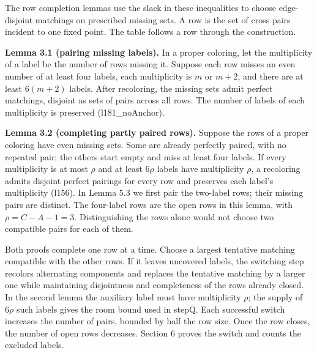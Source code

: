 \documentclass[english,11pt,a4paper]{article}
\begin{document}
The row completion lemmas use the slack in these inequalities to choose edge-disjoint matchings on prescribed missing sets. A row is the set of cross pairs incident to one fixed point. The table follows a row through the construction.

\textbf{Lemma 3.1 (pairing missing labels).} In a proper coloring, let the multiplicity of a label be the number of rows missing it. Suppose each row misses an even number of at least four labels, each multiplicity is \(m\) or \(m+2\), and there are at least \(6(m+2)\) labels. After recoloring, the missing sets admit perfect matchings, disjoint as sets of pairs across all rows. The number of labels of each multiplicity is preserved (l181\_noAnchor).

\textbf{Lemma 3.2 (completing partly paired rows).} Suppose the rows of a proper coloring have even missing sets. Some are already perfectly paired, with no repeated pair; the others start empty and miss at least four labels. If every multiplicity is at most \(\rho\) and at least \(6\rho\) labels have multiplicity \(\rho\), a recoloring admits disjoint perfect pairings for every row and preserves each label's multiplicity (l156). In Lemma 5.3 we first pair the two-label rows; their missing pairs are distinct. The four-label rows are the open rows in this lemma, with \(\rho=C-A-1=3\). Distinguishing the rows alone would not choose two compatible pairs for each of them.

Both proofs complete one row at a time. Choose a largest tentative matching compatible with the other rows. If it leaves uncovered labels, the switching step recolors alternating components and replaces the tentative matching by a larger one while maintaining disjointness and completeness of the rows already closed. In the second lemma the auxiliary label must have multiplicity \(\rho\); the supply of \(6\rho\) such labels gives the room bound used in stepQ. Each successful switch increases the number of pairs, bounded by half the row size. Once the row closes, the number of open rows decreases. Section 6 proves the switch and counts the excluded labels.
\end{document}

